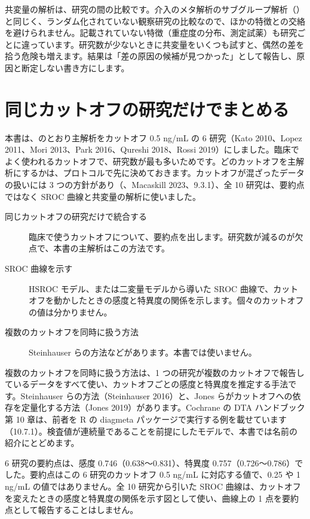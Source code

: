 共変量の解析は、研究の間の比較です。介入のメタ解析のサブグループ解析（）と同じく、ランダム化されていない観察研究の比較なので、ほかの特徴との交絡を避けられません。記載されていない特徴（重症度の分布、測定試薬）も研究ごとに違っています。研究数が少ないときに共変量をいくつも試すと、偶然の差を拾う危険も増えます。結果は「差の原因の候補が見つかった」として報告し、原因と断定しない書き方にします。

\section{同じカットオフの研究だけでまとめる}
\label{sec:14-4}

本書は、のとおり主解析をカットオフ 0.5 ng/mL の 6 研究（Kato 2010、Lopez 2011、Mori 2013、Park 2016、Qureshi 2018、Rossi 2019）にしました。臨床でよく使われるカットオフで、研究数が最も多いためです。どのカットオフを主解析にするかは、プロトコルで先に決めておきます。カットオフが混ざったデータの扱いには 3 つの方針があり（、Macaskill 2023、9.3.1）、全 10 研究は、要約点ではなく SROC 曲線と共変量の解析に使いました。

\begin{description}
\item[同じカットオフの研究だけで統合する] 臨床で使うカットオフについて、要約点を出します。研究数が減るのが欠点で、本書の主解析はこの方法です。
\item[SROC 曲線を示す] HSROC モデル、または二変量モデルから導いた SROC 曲線で、カットオフを動かしたときの感度と特異度の関係を示します。個々のカットオフの値は分かりません。
\item[複数のカットオフを同時に扱う方法] Steinhauser らの方法などがあります。本書では使いません。
\end{description}

\begin{hattenbox}
複数のカットオフを同時に扱う方法は、1 つの研究が複数のカットオフで報告しているデータをすべて使い、カットオフごとの感度と特異度を推定する手法です。Steinhauser らの方法（Steinhauser 2016）と、Jones らがカットオフへの依存を定量化する方法（Jones 2019）があります。Cochrane の DTA ハンドブック第 10 章は、前者を R の diagmeta パッケージで実行する例を載せています（10.7.1）。検査値が連続量であることを前提にしたモデルで、本書では名前の紹介にとどめます。
\end{hattenbox}

6 研究の要約点は、感度 0.746（0.638〜0.831）、特異度 0.757（0.726〜0.786）でした。要約点はこの 6 研究のカットオフ 0.5 ng/mL に対応する値で、0.25 や 1 ng/mL の値ではありません。全 10 研究から引いた SROC 曲線は、カットオフを変えたときの感度と特異度の関係を示す図として使い、曲線上の 1 点を要約点として報告することはしません。

